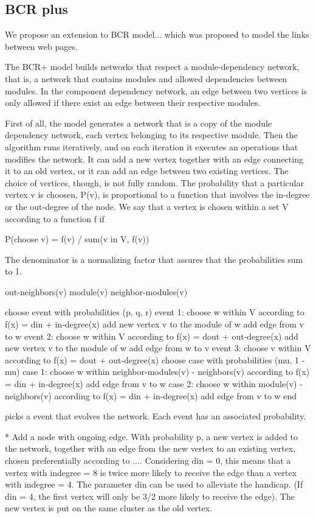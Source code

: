 \subsection{BCR plus}

We propose an extension to BCR model... which was proposed to model the links
between web pages.

The BCR+ model builds networks that respect a module-dependency network, that
is, a network that contains modules and allowed dependencies between modules. 
In the component dependency network, an edge between two vertices is only
allowed if there exist an edge between their respective modules.

First of all, the model generates a network that is a copy of the module
dependency network, each vertex belonging to its respective module. Then the
algorithm runs iteratively, and on each iteration it executes an operations that
modifies the network. It can add a new vertex together with an edge connecting it
to an old vertex, or it can add an edge between two existing vertices. The
choice of vertices, though, is not fully random. The probability that a
particular vertex v is choosen, P(v), is proportional to a function that involves the
in-degree or the out-degree of the node. We say that a vertex is chosen within a
set V according to a function f if

P(choose v) = f(v) / sum(v in V, f(v))

The denominator is a normalizing factor that assures that the probabilities sum
to 1.

out-neighbors(v) 
module(v)
neighbor-modules(v)

choose event with probabilities (p, q, r)
event 1:
  choose w within V according to f(x) = din + in-degree(x)
  add new vertex v to the module of w
  add edge from v to w
event 2:
  choose w within V according to f(x) = dout + out-degree(x)
  add new vertex v to the module of w
  add edge from w to v
event 3:
  choose v within V according to f(x) = dout + out-degree(x)
  choose case with probabilities (mu, 1 - mu)
  case 1: %
    choose w within neighbor-modules(v) - neighbors(v) according to f(x) = din + in-degree(x)
    add edge from v to w
  case 2:
    choose w within module(v) - neighbors(v) according to f(x) = din + in-degree(x)
    add edge from v to w
end

picks a event that evolves
the network. Each event has an associated probability.

* Add a node with ongoing edge. With probability p, a new vertex is added to the network, together with an
edge from the new vertex to an existing vertex, chosen preferentially according
to .... Considering din = 0, this means that a vertex with indegree = 8 is
twice more likely to receive the edge than a vertex with indegree = 4. The
parameter din can be used to alleviate the handicap. (If din = 4, the first
vertex will only be 3/2 more likely to receive the edge). The new vertex is
put on the same cluster as the old vertex.

